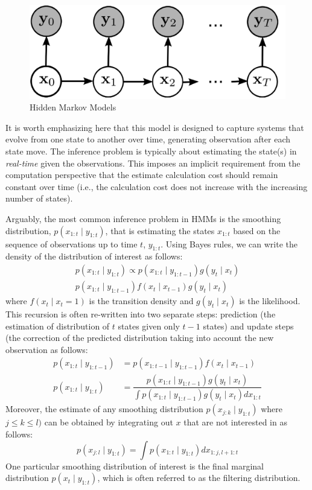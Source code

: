 \begin{figure}
\includegraphics[scale=1]{hmm.png} 
\caption{Hidden Markov Models}
\label{fig:HMM}
\end{figure}

It is worth emphasizing here that this model is designed to capture systems that evolve from one state to another over time, generating observation after each state move. The inference problem is typically about estimating the state(s) in \emph{real-time} given the observations. This imposes an implicit requirement from the computation perspective that the estimate calculation cost should remain constant over time (i.e., the calculation cost does not increase with the increasing number of states).

Arguably, the most common inference problem in HMMs is the smoothing distribution, $p(x_{1:t} \mid y_{1:t})$, that is estimating the states $x_{1:t}$ based on the sequence of observations up to time $t$, $y_{1:t}$. Using Bayes rules, we can write the density of the distribution of interest as follows:
\begin{align}
    p(x_{1:t} \mid y_{1:t}) \propto p(x_{1:t} \mid y_{1:t-1}) g(y_t \mid x_t) \nonumber \\
    p(x_{1:t} \mid y_{1:t-1})f(x_t \mid x_{t-1})g(y_t \mid x_t)
\end{align}
where $f(x_t \mid x_t=1)$ is the transition density and $g(y_t \mid x_t)$ is the likelihood. This recursion is often re-written into two separate steps: prediction (the estimation of distribution of $t$ states given only $t-1$ states) and update steps (the correction of the predicted distribution taking into account the new observation as follows:
\begin{align}
  p(x_{1:t} \mid y_{1:t-1}) &= p(x_{1:t-1} \mid y_{1:t-1})f(x_t \mid x_{t-1}) \nonumber \\
  p(x_{1:t} \mid y_{1:t})   &= \dfrac{p(x_{1:t} \mid y_{1:t-1}) g(y_t \mid x_t)}{\int p(x_{1:t} \mid y_{1:t-1}) g(y_t \mid x_t) dx_{1:t}}
\end{align}
Moreover, the estimate of any smoothing distribution $p(x_{j:k} \mid y_{1:t})$ where $j \leq k \leq l)$ can be obtained by integrating out $x$ that are not interested in as follows:
\begin{equation}
  p(x_{j:l} \mid y_{1:t}) = \int p(x_{1:t} \mid y_{1:t}) dx_{1:j, l+1:t}
\label{eq:smoothing}
\end{equation}
One particular smoothing distribution of interest is the final marginal distribution $p(x_t \mid y_{1:t})$, which is often referred to as the filtering distribution.

